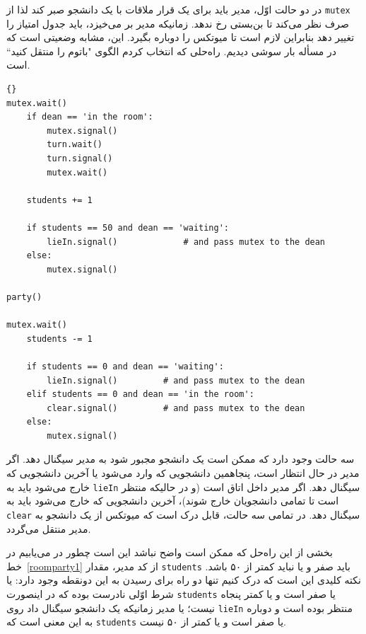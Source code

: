 \documentclass{book}
\newcommand{\clearemptydoublepage}{\newpage\cleardoublepage}
\begin{document}
    در دو حالت اوّل، مدیر باید برای یک قرار ملاقات با یک دانشجو صبر کند لذا از {\tt mutex} صرف نظر می‌‌کند تا بن‌بستی رخ ندهد. 
    زمانیکه مدیر بر می‌خیزد، باید جدول امتیاز را تغییر دهد بنابراین لازم است تا میوتکس را دوباره بگیرد. 
    این، مشابه وضعیتی است که در مسأله بار سوشی دیدیم. راه‌حلی که انتخاب کردم الگوی "باتوم را منتقل کنید`` است. 

\newpage
\begin{latin}
\begin{lstlisting}[title=\rl{راه‌حل اتاق پارتی (دانشجو)}]{}
mutex.wait()
    if dean == 'in the room':
        mutex.signal()
        turn.wait()
        turn.signal()
        mutex.wait()

    students += 1

    if students == 50 and dean == 'waiting':
        lieIn.signal()             # and pass mutex to the dean
    else:
        mutex.signal()

party()

mutex.wait()
    students -= 1

    if students == 0 and dean == 'waiting':
        lieIn.signal()         # and pass mutex to the dean
    elif students == 0 and dean == 'in the room':
        clear.signal()         # and pass mutex to the dean
    else:
        mutex.signal()
\end{lstlisting}
\end{latin}

    سه حالت وجود دارد که ممکن است یک دانشجو مجبور شود به مدیر سیگنال دهد. 
    اگر مدیر در حال انتظار است،  پنجاهمین دانشجویی که وارد می‌شود یا آخرین دانشجویی که خارج می‌شود باید  به {\tt lieIn} سیگنال دهد.
    اگر مدیر داخل اتاق است (و در حالیکه منتظر است تا تمامی دانشجویان خارج شوند)، آخرین دانشجویی که خارج می‌شود باید به {\tt clear} سیگنال دهد. 
    در تمامی سه حالت، قابل درک است که میوتکس از یک دانشجو به مدیر منتقل می‌گردد. 

    بخشی از این راه‌حل که ممکن است واضح نباشد این است چطور در می‌یابیم در خط~\ref{roomparty1} از کد مدیر، مقدار {\tt students}  
    باید صفر و یا نباید کمتر از ۵۰ باشد. نکته کلیدی این است که درک کنیم تنها دو راه برای رسیدن به این دونقطه وجود دارد: یا شرط اوّلی نادرست بوده 
    که در اینصورت  {\tt students} یا صفر است و یا کمتر پنجاه نیست؛‌ یا مدیر زمانیکه یک دانشجو سیگنال داد روی {\tt lieIn} منتظر بوده است و 
    دوباره به این معنی است که {\tt students}  یا صفر است و یا کمتر از ۵۰ نیست. 
    
    
\clearemptydoublepage
\end{document}
